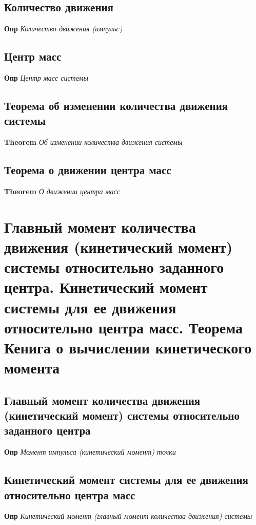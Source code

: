 \documentclass[a4paper, 14pt]{article}
\begin{document}
    \subsection{Количество движения}
    
    \textbf{Опр} \textit{Количество движения (импульс)}
    
    \subsection{Центр масс}
    
    \textbf{Опр} \textit{Центр масс системы}
    
    \subsection{Теорема об изменении количества движения системы}
    
    \textbf{Theorem} \textit{Об изменении количества движения системы}
    
    \subsection{Теорема о движении центра масс}
    
    \textbf{Theorem} \textit{О движении центра масс}
    
    \section{Главный момент количества движения (кинетический момент) системы относительно заданного центра.
    Кинетический момент системы для ее движения относительно центра масс.
    Теорема Кенига о вычислении кинетического момента}
    
    \subsection{Главный момент количества движения (кинетический момент) системы относительно заданного центра}
    
    \textbf{Опр} \textit{Момент импульса (кинетический момент) точки}
    
    \subsection{Кинетический момент системы для ее движения относительно центра масс}
    
    \textbf{Опр} \textit{Кинетический момент (главный момент количества движения) системы}
    
\end{document}
